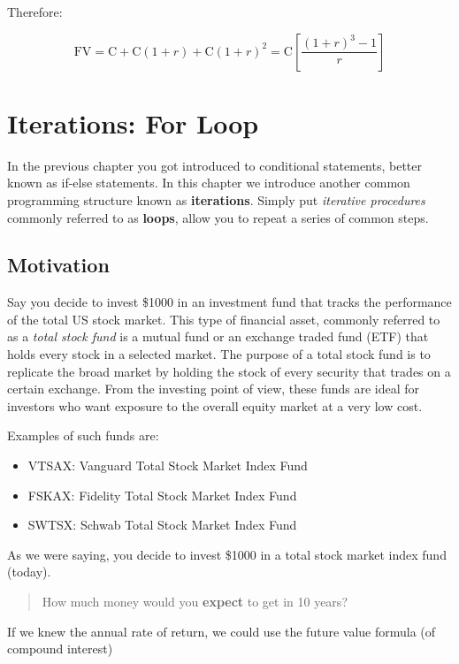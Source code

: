 \documentclass[
]{book}
\begin{document}
Therefore:

\[
\text{FV} = \text{C} + \text{C} (1 + r) + \text{C} (1 + r)^2 = \text{C} \left[ \frac{(1+r)^3 -1}{r} \right]
\]

\hypertarget{for-loop}{%
\chapter{Iterations: For Loop}\label{for-loop}}

In the previous chapter you got introduced to conditional statements, better
known as if-else statements. In this chapter we introduce another common
programming structure known as \textbf{iterations}. Simply put \emph{iterative procedures}
commonly referred to as \textbf{loops}, allow you to repeat a series of common steps.

\hypertarget{motivation-5}{%
\section{Motivation}\label{motivation-5}}

Say you decide to invest \$1000 in an investment fund that tracks the
performance of the total US stock market. This type of financial asset, commonly
referred to as a \emph{total stock fund} is a mutual fund or an exchange traded fund
(ETF) that holds every stock in a selected market. The purpose of a total stock
fund is to replicate the broad market by holding the stock of every security
that trades on a certain exchange. From the investing point of view, these funds
are ideal for investors who want exposure to the overall equity market at a
very low cost.

Examples of such funds are:

\begin{itemize}
\item
  VTSAX: Vanguard Total Stock Market Index Fund
\item
  FSKAX: Fidelity Total Stock Market Index Fund
\item
  SWTSX: Schwab Total Stock Market Index Fund
\end{itemize}

As we were saying, you decide to invest \$1000 in a total stock market index
fund (today).

\begin{quote}
How much money would you \textbf{expect} to get in 10 years?
\end{quote}

If we knew the annual rate of return, we could use the future value formula
(of compound interest)
\end{document}
